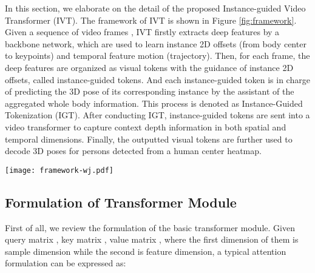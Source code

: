 \documentclass[sigconf]{acmart}
\begin{document}
In this section, we elaborate on the detail of the proposed Instance-guided Video Transformer (IVT). The framework of IVT is shown in Figure \ref{fig:framework}. Given a sequence of video frames , IVT firstly extracts deep features by a backbone network, which are used to learn instance 2D offsets (from body center to  keypoints) and temporal feature motion (trajectory).
Then, for each frame, the deep features are organized as visual tokens with the guidance of instance 2D offsets, called instance-guided tokens. And each instance-guided token is in charge of predicting the 3D pose of its corresponding instance by the assistant of the aggregated whole body information. This process is denoted as Instance-Guided Tokenization (IGT).
After conducting IGT, instance-guided tokens are sent into a video transformer to capture context depth information in both spatial and temporal dimensions. 
Finally, the outputted visual tokens are further used to decode 3D poses for persons detected from a human center heatmap.


\begin{figure*}[!t]
\centering
\texttt{[image: framework-wj.pdf]}
\vspace{-0.8cm}
\caption{The overview of Instance-guided Video Transformer (IVT), which includes instance-guided tokenization (IGT), instance-guided spatial attention (ISA), and instance-guided temporal attention (ITA). Given video frames of height  and width , deep features are extracted by embedding network , and are further used to estimate trajectory motions  by network . The keypoints features are extracted from deep features according to the trajectory and instance 2D offsets and to further learn instance-aware tokens of shape  by IGT. For a query token  at the  block in  frame, ISA is computed in each frame and ITA is computed among temporal frames to capture depth information. Each token in the final layer of IVT outputs the 3D coordinates of a person. MHA, LN, and FFN denote multi-head attention, layer norm, and feed-forward network, respectively.  means element-wise addition.  represents the joints number. N represents token numbers in each frame.}
\label{fig:framework}
\end{figure*}

\subsection{Formulation of Transformer Module}

First of all, we review the formulation of the basic transformer module. Given query matrix , key matrix , value matrix , where the first dimension of them is sample dimension while the second is feature dimension, a typical attention formulation  can be expressed as:
\end{document}
